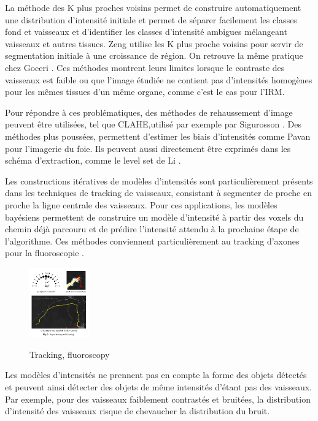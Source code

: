 La méthode des K plus proches voisins permet de construire automatiquement une distribution d'intensité initiale et permet de séparer facilement les classes fond et vaisseaux et d'identifier les classes d'intensité ambigues mélangeant vaisseaux et autres tissues. Zeng \cite{Zeng2018_auto_RG_AC_hepatic_vessels} utilise les K plus proche voisins pour servir de segmentation initiale à une croissance de région. On retrouve la même pratique chez Goceri \cite{Goceri2017_vessel}. Ces méthodes montrent leurs limites lorsque le contraste des vaisseaux est faible ou que l'image étudiée ne contient pas d'intensités homogènes pour les mêmes tissues d'un même organe, comme c'est le cas pour l'IRM.

Pour répondre à ces problématiques, des méthodes de rehaussement d'image peuvent être utilisées, tel que CLAHE,utilisé par exemple par Sigurosson \cite{Sigurosson2014_retinal_morpho_fuzzy}. Des méthodes plus poussées, permettent d'estimer les biais d'intensités comme Pavan \cite{Pavan2018_HCC_detection} pour l'imagerie du foie. Ils peuvent aussi directement être exprimés dans les schéma d'extraction, comme le level set de Li \cite{Li2011_mri_level_set}.

Les constructions itératives de modèles d'intensités sont particulièrement présents dans les techniques de tracking de vaisseaux, consistant à segmenter de proche en proche la ligne centrale des vaisseaux. Pour ces applications, les modèles bayésiens permettent de construire un modèle d'intensité à partir des voxels du chemin déjà parcouru et de prédire l'intensité attendu à la prochaine étape de l'algorithme. Ces méthodes conviennent particulièrement au tracking d'axones pour la fluoroscopie \cite{Radojevic2015_fuzzy_logic}\cite{Radojevic2017_neurons_bayesian_tracing_density}.

\begin{figure}
  \centering
  \includegraphics[height=3cm]{Images/bayesian_tracing.png}
  \label{fig:modele bayesien}
  \caption{Tracking, fluoroscopy}
\end{figure}

Les modèles d'intensités ne prennent pas en compte la forme des objets détectés et peuvent ainsi détecter des objets de même intensités d'étant pas des vaisseaux. Par exemple, pour des vaisseaux faiblement contrastés et bruitées, la distribution d'intensité des vaisseaux risque de chevaucher la distribution du bruit.

